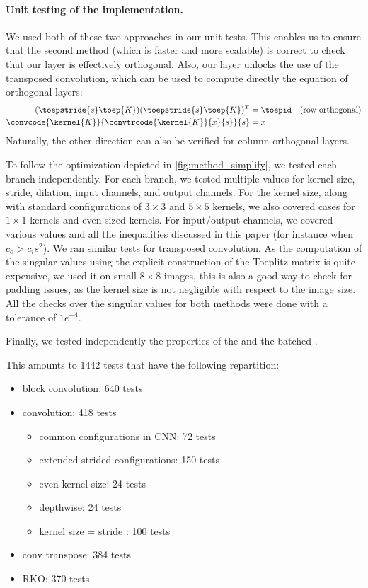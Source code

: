     \paragraph{Unit testing of the implementation.} We used both of these two approaches in our unit tests. This enables us to ensure that the second method (which is faster and more scalable) is correct to check that our layer is effectively orthogonal. Also, our layer unlocks the use of the transposed convolution, which can be used to compute directly the equation of orthogonal layers:
    \begin{align*}
        (\toepstride{s} \toep{K})(\toepstride{s} \toep{K})^T &= \toepid \quad \text{(row orthogonal)} \\
        \convcode{\kernel{K}}{\convtrcode{\kernel{K}}{x}{s}}{s} &= x
    \end{align*}
    Naturally, the other direction can also be verified for column orthogonal layers.

    To follow the optimization depicted in \cref{fig:method_simplify}, we tested each branch independently. For each branch, we tested multiple values for kernel size, stride, dilation, input channels, and output channels. For the kernel size, along with standard configurations of $3 \times 3$ and $5 \times 5$ kernels, we also covered cases for $1 \times 1$ kernels and even-sized kernels. For input/output channels, we covered various values and all the inequalities discussed in this paper (for instance when $c_o > c_is^2$).
    We ran similar tests for transposed convolution. As the computation of the singular values using the explicit construction of the Toeplitz matrix is quite expensive, we used it on small $8 \times 8$ images, this is also a good way to check for padding issues, as the kernel size is not negligible with respect to the image size. All the checks over the singular values for both methods were done with a tolerance of $1e^{-4}$. 

    Finally, we tested independently the properties of the \Bconv{} and the batched \Bconv{}.

    This amounts to 1442 tests that have the following repartition:
    \begin{itemize}
        \item block convolution: 640 tests
        \item convolution: 418 tests
        \begin{itemize}
            \item common configurations in CNN: 72 tests
            \item extended strided configurations: 150 tests
            \item even kernel size: 24 tests
            \item depthwise: 24 tests
            \item kernel size = stride : 100 tests
        \end{itemize}
        \item conv transpose: 384 tests
        \item RKO: 370 tests
    \end{itemize}

